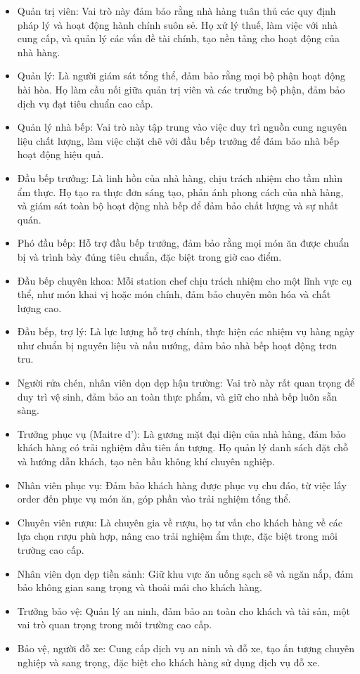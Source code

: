 \begin{itemize}
    \item Quản trị viên: Vai trò này đảm bảo rằng nhà hàng tuân thủ các quy định pháp lý và hoạt động hành chính suôn sẻ. Họ xử lý thuế, làm việc với nhà cung cấp, và quản lý các vấn đề tài chính, tạo nền tảng cho hoạt động của nhà hàng.
    \item Quản lý: Là người giám sát tổng thể, đảm bảo rằng mọi bộ phận hoạt động hài hòa. Họ làm cầu nối giữa quản trị viên và các trưởng bộ phận, đảm bảo dịch vụ đạt tiêu chuẩn cao cấp.
    \item Quản lý nhà bếp: Vai trò này tập trung vào việc duy trì nguồn cung nguyên liệu chất lượng, làm việc chặt chẽ với đầu bếp trưởng để đảm bảo nhà bếp hoạt động hiệu quả.
    \item Đầu bếp trưởng: Là linh hồn của nhà hàng, chịu trách nhiệm cho tầm nhìn ẩm thực. Họ tạo ra thực đơn sáng tạo, phản ánh phong cách của nhà hàng, và giám sát toàn bộ hoạt động nhà bếp để đảm bảo chất lượng và sự nhất quán.
    \item Phó đầu bếp: Hỗ trợ đầu bếp trưởng, đảm bảo rằng mọi món ăn được chuẩn bị và trình bày đúng tiêu chuẩn, đặc biệt trong giờ cao điểm.
    \item Đầu bếp chuyên khoa: Mỗi station chef chịu trách nhiệm cho một lĩnh vực cụ thể, như món khai vị hoặc món chính, đảm bảo chuyên môn hóa và chất lượng cao.
    \item Đầu bếp, trợ lý: Là lực lượng hỗ trợ chính, thực hiện các nhiệm vụ hàng ngày như chuẩn bị nguyên liệu và nấu nướng, đảm bảo nhà bếp hoạt động trơn tru.
    \item Người rửa chén, nhân viên dọn dẹp hậu trường: Vai trò này rất quan trọng để duy trì vệ sinh, đảm bảo an toàn thực phẩm, và giữ cho nhà bếp luôn sẵn sàng.
    \item Trưởng phục vụ (Maitre d'): Là gương mặt đại diện của nhà hàng, đảm bảo khách hàng có trải nghiệm đầu tiên ấn tượng. Họ quản lý danh sách đặt chỗ và hướng dẫn khách, tạo nên bầu không khí chuyên nghiệp.
    \item Nhân viên phục vụ: Đảm bảo khách hàng được phục vụ chu đáo, từ việc lấy order đến phục vụ món ăn, góp phần vào trải nghiệm tổng thể.
    \item Chuyên viên rượu: Là chuyên gia về rượu, họ tư vấn cho khách hàng về các lựa chọn rượu phù hợp, nâng cao trải nghiệm ẩm thực, đặc biệt trong môi trường cao cấp.
    \item Nhân viên dọn dẹp tiền sảnh: Giữ khu vực ăn uống sạch sẽ và ngăn nắp, đảm bảo không gian sang trọng và thoải mái cho khách hàng.
    \item Trưởng bảo vệ: Quản lý an ninh, đảm bảo an toàn cho khách và tài sản, một vai trò quan trọng trong môi trường cao cấp.
    \item Bảo vệ, người đỗ xe: Cung cấp dịch vụ an ninh và đỗ xe, tạo ấn tượng chuyên nghiệp và sang trọng, đặc biệt cho khách hàng sử dụng dịch vụ đỗ xe.
\end{itemize}

